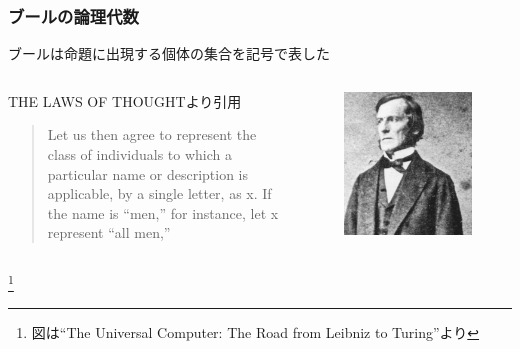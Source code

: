 \documentclass[unicode, 14pt, aspectratio=169]{beamer}
\newcommand\blfootnote[1]{%
  \begingroup
  \renewcommand\thefootnote{}\footnote{#1}%
  \addtocounter{footnote}{-1}%
  \endgroup
}
\begin{document}
\begin{frame}
  \frametitle{ブールの論理代数}
  {\large ブールは命題に出現する個体の集合を記号で表した}
  \begin{columns}
    \begin{column}{0.7\textwidth}
      \begin{center}
        THE LAWS OF THOUGHT\supercite{bool}より引用
        \begin{quotation}
          Let us then agree to represent the class of individuals to which a particular name or description is applicable, by a single letter, as x. If the name is “men,” for instance, let x represent “all men,”
        \end{quotation}
      \end{center}
    \end{column}    
    \begin{column}{0.2\textwidth}
      \begin{figure}
        \includegraphics[width=1\textwidth]{images/bool.png}
      \end{figure}       
    \end{column} 
  \end{columns}
  \blfootnote{図は``The Universal Computer: The Road from Leibniz to Turing''より}
\end{frame}
\end{document}
